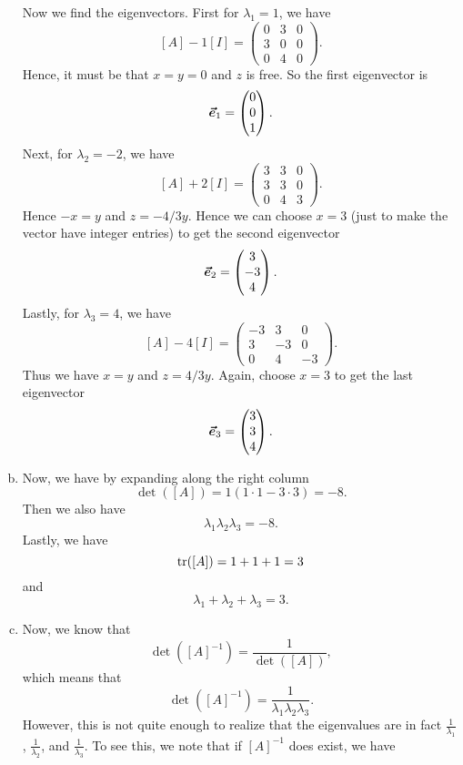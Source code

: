 \documentclass[12pt]{article} %
\begin{document}
\begin{solution}
\begin{enumerate}[(a)]
    Now we find the eigenvectors. First for $\lambda_1=1$, we have
    \[
    [A]-1[I] = \begin{pmatrix} 0 & 3 & 0 \\ 3 & 0 & 0 \\ 0 & 4 & 0 \end{pmatrix}.
    \]
    Hence, it must be that $x=y=0$ and $z$ is free. So the first eigenvector is
    \[
    \boldsymbol{\vec{e}}_1 = \begin{pmatrix} 0 \\ 0 \\ 1 \end{pmatrix}.
    \]
    Next, for $\lambda_2 = -2$, we have
    \[
    [A]+2[I] = \begin{pmatrix} 3 & 3 & 0 \\ 3 & 3 & 0\\ 0 & 4 & 3 \end{pmatrix}.
    \]
    Hence $-x=y$ and $z=-4/3y$. Hence we can choose $x=3$ (just to make the vector have integer entries) to get the second eigenvector
    \[
    \boldsymbol{\vec{e}}_2 = \begin{pmatrix} 3 \\ -3  \\ 4 \end{pmatrix}.
    \]
    Lastly, for $\lambda_3 = 4$, we have
    \[
    [A]-4[I] =\begin{pmatrix} -3 & 3 & 0 \\ 3 & -3 & 0 \\ 0 & 4 & -3 \end{pmatrix}.
    \]
    Thus we have $x=y$ and $z=4/3y$. Again, choose $x=3$ to get the last eigenvector
    \[
    \boldsymbol{\vec{e}}_3 = \begin{pmatrix} 3 \\ 3 \\ 4 \end{pmatrix}.
    \]
    \item Now, we have by expanding along the right column
    \[
    \det([A])=1(1\cdot 1 - 3\cdot 3)=-8.
    \]
    Then we also have
    \[
    \lambda_1\lambda_2 \lambda_3 = -8.
    \]
    Lastly, we have
    \[
    \mathrm{tr}([A]) = 1 + 1 + 1 =3 
    \]
    and
    \[
    \lambda_1 + \lambda_2 + \lambda_3 = 3.
    \]
    \item Now, we know that
    \[
    \det([A]^{-1})=\frac{1}{\det([A])},
    \]
    which means that
    \[
    \det([A]^{-1})=\frac{1}{\lambda_1 \lambda_2 \lambda_3}.
    \]
    However, this is not quite enough to realize that the eigenvalues are in fact $\frac{1}{\lambda_1}$, $\frac{1}{\lambda_2}$, and $\frac{1}{\lambda_3}$. To see this, we note that if $[A]^{-1}$ does exist, we have

\end{enumerate}
\end{solution}
\end{document}
